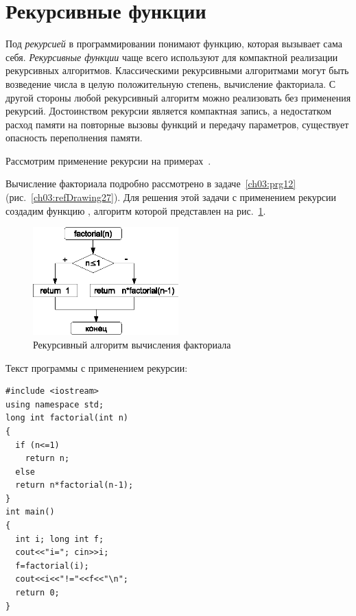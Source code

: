 \section[Рекурсивные функции]{Рекурсивные функции}
Под \emph{рекурсией} в программировании понимают функцию, которая вызывает сама себя.
\emph{Рекурсивные функции} чаще всего используют для компактной реализации
рекурсивных алгоритмов. Классическими рекурсивными алгоритмами могут быть возведение числа в целую положительную
степень, вычисление факториала. С другой стороны любой рекурсивный алгоритм можно реализовать без применения рекурсий.
Достоинством рекурсии является компактная запись, а недостатком расход памяти на повторные вызовы функций и передачу
параметров, существует опасность переполнения памяти.

Рассмотрим применение рекурсии на примерах~\cite{C,Shim}. %


Вычисление факториала подробно рассмотрено в задаче~\ref{ch03:prg12} 
(рис.~\ref{ch03:refDrawing27}). Для решения этой задачи с применением рекурсии
создадим функцию , алгоритм которой представлен на рис.~\ref{ch04:refDrawing9}. 

\begin{figure}[htb]
\begin{center}
\includegraphics[width=0.5\textwidth]{img/ris_4_10}
\caption{Рекурсивный алгоритм вычисления факториала}
\label{ch04:refDrawing9}
\end{center}
\end{figure}


Текст программы с применением рекурсии:
\begin{lstlisting}
#include <iostream>
using namespace std;
long int factorial(int n)
{
  if (n<=1) 
    return n; 
  else 
  return n*factorial(n-1); 
}
int main()
{
  int i; long int f;
  cout<<"i="; cin>>i;
  f=factorial(i); 
  cout<<i<<"!="<<f<<"\n"; 
  return 0;
}
\end{lstlisting}

